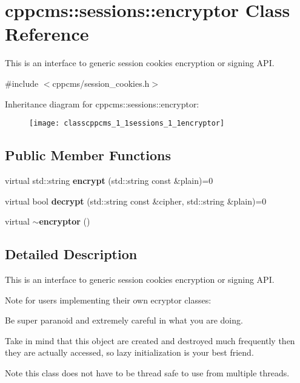 \section{cppcms\+:\+:sessions\+:\+:encryptor Class Reference}
\label{classcppcms_1_1sessions_1_1encryptor}


This is an interface to generic session cookies encryption or signing A\+PI.  




{\ttfamily \#include $<$cppcms/session\+\_\+cookies.\+h$>$}

Inheritance diagram for cppcms\+:\+:sessions\+:\+:encryptor\+:\begin{figure}[H]
\begin{center}
\leavevmode
\texttt{[image: classcppcms\_1\_1sessions\_1\_1encryptor]}
\end{center}
\end{figure}
\subsection*{Public Member Functions}
\begin{DoxyCompactItemize}
\item 
virtual std\+::string {\bf encrypt} (std\+::string const \&plain)=0
\item 
virtual bool {\bf decrypt} (std\+::string const \&cipher, std\+::string \&plain)=0
\item 
virtual {\bf $\sim$encryptor} ()
\end{DoxyCompactItemize}


\subsection{Detailed Description}
This is an interface to generic session cookies encryption or signing A\+PI. 

Note for users implementing their own ecryptor classes\+:


\begin{DoxyItemize}
\item Be super paranoid and extremely careful in what you are doing.
\item Take in mind that this object are created and destroyed much frequently then they are actually accessed, so lazy initialization is your best friend.
\end{DoxyItemize}

Note this class does not have to be thread safe to use from multiple threads. 


